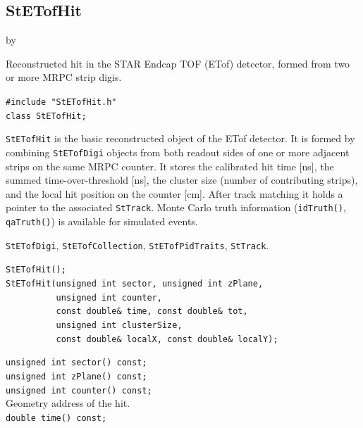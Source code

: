 \documentclass[twoside]{article}
\newcommand{\entrylabel}[1]{\mbox{\textbf{{#1}}}\hfil}%
\newenvironment{entry}
{\begin{list}{}%
    {\renewcommand{\makelabel}{\entrylabel}%
     \setlength{\labelwidth}{90pt}%
     \setlength{\leftmargin}{\labelwidth}
     \advance\leftmargin by \labelsep%
      }%
    }%
  {\end{list}}
\newcommand{\Entrylabel}[1]%
{\raisebox{0pt}[1ex][0pt]{\makebox[\labelwidth][l]%
    {\parbox[t]{\labelwidth}{\hspace{0pt}\textbf{{#1}}}}}}
\newenvironment{Entry}%
{\renewcommand{\entrylabel}{\Entrylabel}\begin{entry}}%
  {\end{entry}}
\begin{document}
\subsection{StETofHit}
\label{sec:StETofHit}
\begin{Entry}
\item[Summary] Reconstructed hit in the STAR Endcap TOF (ETof) detector,
    formed from two or more MRPC strip digis.
\item[Synopsis]
    \verb+#include "StETofHit.h"+\\
    \verb+class StETofHit;+\\
\item[Description]
    \texttt{StETofHit} is the basic reconstructed object of the ETof
    detector.  It is formed by combining \texttt{StETofDigi} objects from
    both readout sides of one or more adjacent strips on the same MRPC
    counter.  It stores the calibrated hit time [ns], the summed
    time-over-threshold [ns], the cluster size (number of contributing
    strips), and the local hit position on the counter [cm].  After track
    matching it holds a pointer to the associated \texttt{StTrack}.
    Monte Carlo truth information (\verb+idTruth()+, \verb+qaTruth()+) is
    available for simulated events.
\item[Related Classes]
    \texttt{StETofDigi}, \texttt{StETofCollection}, \texttt{StETofPidTraits},
    \texttt{StTrack}.
\item[Public\\ Constructors]
    \verb+StETofHit();+\\
    \verb+StETofHit(unsigned int sector, unsigned int zPlane,+\\
    \verb+          unsigned int counter,+\\
    \verb+          const double& time, const double& tot,+\\
    \verb+          unsigned int clusterSize,+\\
    \verb+          const double& localX, const double& localY);+\\
\item[Public Member\\ Functions]
    \verb+unsigned int sector() const;+\\
    \verb+unsigned int zPlane() const;+\\
    \verb+unsigned int counter() const;+\\
    Geometry address of the hit.\\
    \verb+double time() const;+\\

\end{Entry}
\end{document}
